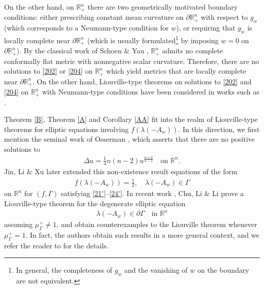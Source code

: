 \documentclass[12pt]{article}
\numberwithin{equation}{section}
\theoremstyle{plain}
\theoremstyle{definition}
\begin{document}
On the other hand, on $\mathbb{R}_+^n$ there are two geometrically motivated boundary conditions: either prescribing constant mean curvature on $\partial\mathbb{R}_+^n$ with respect to $g_w$ (which corresponds to a Neumann-type condition for $w$), or requiring that $g_w$ is locally complete near $\partial \mathbb{R}_+^n$ (which is usually formulated\footnote{In general, the completeness of $g_w$ and the vanishing of $w$ on the boundary are not equivalent.} by imposing $w=0$ on $\partial\mathbb{R}_+^n$). By the classical work of Schoen \& Yau \cite[Theorem 2.7]{SY88}, $\mathbb{R}_+^n$ admits no complete conformally flat metric with nonnegative scalar curvature. Therefore, there are no solutions to \eqref{202} or \eqref{204} on $\mathbb{R}_+^n$ which yield metrics that are locally complete near $\partial\mathbb{R}_+^n$. On the other hand, Liouville-type theorems on solutions to \eqref{202} and \eqref{204} on $\mathbb{R}_+^n$ with Neumann-type conditions have been considered in works such as \cite{LL06, Wei24, CLL24a, CLL24b,LZ95,CSF96,LZ03, CW18, E90}.\medskip 

 Theorem \ref{B}, Theorem \ref{A} and Corollary \ref{AA} fit into the realm of Liouville-type theorems for elliptic equations involving $f(\lambda(-A_w))$. In this direction, we first mention the seminal work of Osserman \cite{Oss57}, which asserts that there are no positive solutions to
\begin{align*}
\Delta u = \frac{1}{4}n(n-2)u^{\frac{n+2}{n-2}} \quad \text{on }\mathbb{R}^n.
\end{align*}
Jin, Li \& Xu \cite{JLX05} later extended this non-existence result equations of the form
\begin{align}\label{205}
f(\lambda(-A_w)) = \frac{1}{2}, \quad \lambda(-A_w)\in\Gamma 
\end{align}
on $\mathbb{R}^n$ for $(f,\Gamma)$ satisfying \eqref{21'}--\eqref{24'}. In recent work \cite{CLL23}, Chu, Li \& Li prove a Liouville-type theorem for the degenerate elliptic equation 
\begin{align*}
\lambda(-A_w)\in\partial\Gamma \quad \text{in }\mathbb{R}^n
\end{align*}
assuming $\mu_\Gamma^+\not=1$, and obtain counterexamples to the Liouville theorem whenever $\mu_\Gamma^+=1$. In fact, the authors obtain such results in a more general context, and we refer the reader to \cite{CLL23} for the details.\medskip  
\end{document}
